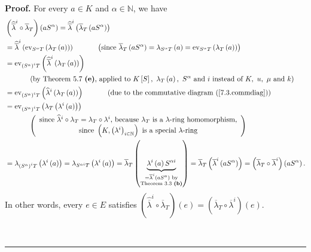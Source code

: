 \documentclass[numbers=enddot,12pt,final,onecolumn,notitlepage]{scrartcl}%
\newenvironment{proof}[1][Proof]{\noindent\textbf{#1.} }{\ \rule{0.5em}{0.5em}}
\begin{document}
\begin{proof}
For every $a\in K$ and $\alpha\in\mathbb{N}$, we have%
\begin{align*}
&  \left(  \widehat{\overline{\lambda}}^{i}\circ\overline{\lambda}_{T}\right)
\left(  aS^{\alpha}\right)  =\widehat{\overline{\lambda}}^{i}\left(
\overline{\lambda}_{T}\left(  aS^{\alpha}\right)  \right) \\
&  =\widehat{\overline{\lambda}}^{i}\left(  \operatorname*{ev}%
\nolimits_{S^{\alpha}T}\left(  \lambda_{T}\left(  a\right)  \right)  \right)
\ \ \ \ \ \ \ \ \ \ \left(  \text{since }\overline{\lambda}_{T}\left(
aS^{\alpha}\right)  =\lambda_{S^{\alpha}T}\left(  a\right)
=\operatorname*{ev}\nolimits_{S^{\alpha}T}\left(  \lambda_{T}\left(  a\right)
\right)  \right) \\
&  =\operatorname*{ev}\nolimits_{\left(  S^{\alpha}\right)  ^{i}T}\left(
\widehat{\overline{\lambda}}^{i}\left(  \lambda_{T}\left(  a\right)  \right)
\right) \\
&  \ \ \ \ \ \ \ \ \ \ \left(  \text{by Theorem 5.7 \textbf{(e)}, applied to
}K\left[  S\right]  ,\text{ }\lambda_{T}\left(  a\right)  ,\text{ }S^{\alpha
}\text{ and }i\text{ instead of }K,\text{ }u,\text{ }\mu\text{ and }k\right)
\\
&  =\operatorname*{ev}\nolimits_{\left(  S^{\alpha}\right)  ^{i}T}\left(
\widehat{\lambda}^{i}\left(  \lambda_{T}\left(  a\right)  \right)  \right)
\ \ \ \ \ \ \ \ \ \ \left(  \text{due to the commutative diagram
(\ref{7.3.commdiag})}\right) \\
&  =\operatorname*{ev}\nolimits_{\left(  S^{\alpha}\right)  ^{i}T}\left(
\lambda_{T}\left(  \lambda^{i}\left(  a\right)  \right)  \right) \\
&  \ \ \ \ \ \ \ \ \ \ \left(
\begin{array}
[c]{c}%
\text{since }\widehat{\lambda}^{i}\circ\lambda_{T}=\lambda_{T}\circ\lambda
^{i}\text{, because }\lambda_{T}\text{ is a }\lambda\text{-ring homomorphism,}%
\\
\text{since }\left(  K,\left(  \lambda^{i}\right)  _{i\in\mathbb{N}}\right)
\text{ is a special }\lambda\text{-ring}%
\end{array}
\right) \\
&  =\lambda_{\left(  S^{\alpha}\right)  ^{i}T}\left(  \lambda^{i}\left(
a\right)  \right)  =\lambda_{S^{\alpha i}T}\left(  \lambda^{i}\left(
a\right)  \right)  =\overline{\lambda}_{T}\left(  \underbrace{\lambda
^{i}\left(  a\right)  S^{\alpha i}}_{\substack{=\overline{\lambda}^{i}\left(
aS^{\alpha}\right)  \text{ by}\\\text{Theorem 3.3 \textbf{(b)}}}}\right)
=\overline{\lambda}_{T}\left(  \overline{\lambda}^{i}\left(  aS^{\alpha
}\right)  \right)  =\left(  \overline{\lambda}_{T}\circ\overline{\lambda}%
^{i}\right)  \left(  aS^{\alpha}\right)  .
\end{align*}
In other words, every $e\in E$ satisfies $\left(  \widehat{\overline{\lambda}%
}^{i}\circ\overline{\lambda}_{T}\right)  \left(  e\right)  =\left(
\overline{\lambda}_{T}\circ\overline{\lambda}^{i}\right)  \left(  e\right)  $.


\end{proof}
\end{document}
